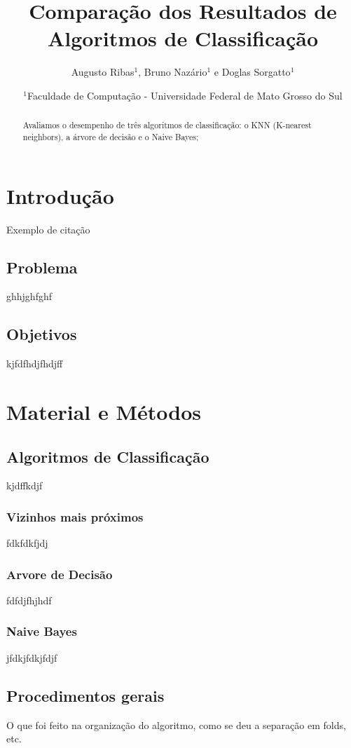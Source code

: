 \documentclass[12pt, a4paper, brazil]{article}
\title{Comparação dos Resultados de Algoritmos de Classificação}
\author{Augusto Ribas$^1$, Bruno Nazário$^1$ e Doglas Sorgatto$^1$}
\date{$^1$Faculdade de Computação - Universidade Federal de Mato Grosso do Sul}
\begin{document}
\maketitle

\begin{abstract}
Avaliamos o desempenho de três algoritmos de classificação: o KNN (K-nearest neighbors), a árvore de decisão e o Naive Bayes;
\end{abstract}
%
\section{Introdução}

Exemplo de citação  \citep{Mitchell1997}

\subsection{Problema}
ghhjghfghf

\subsection{Objetivos}
kjfdfhdjfhdjff

\section{Material e Métodos}

\subsection{Algoritmos de Classificação}
kjdffkdjf
\subsubsection{Vizinhos mais próximos}
fdkfdkfjdj
\subsubsection{Arvore de Decisão}
fdfdjfhjhdf
\subsubsection{Naive Bayes}
jfdkjfdkjfdjf

\subsection{Procedimentos gerais}
O que foi feito na organização do algoritmo, como se deu a separação em folds, etc.
\end{document}
